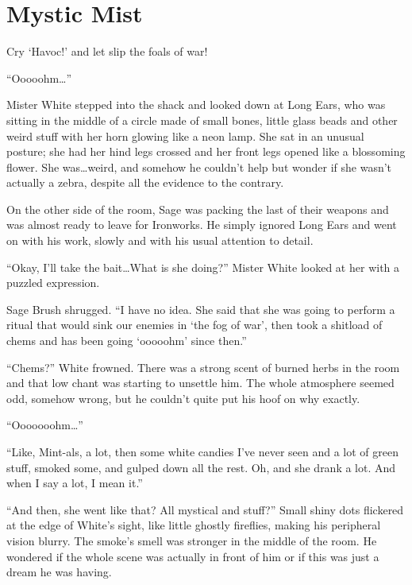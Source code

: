 
\chapter{Mystic Mist}


\begin{intro}
Cry `Havoc!' and let slip the foals of war!
\end{intro}



``Ooooohm\dots''

Mister White stepped into the shack and looked down at Long Ears, who was sitting in the middle of a circle made of small bones, little glass beads and other weird stuff with her horn glowing like a neon lamp. She sat in an unusual posture; she had her hind legs crossed and her front legs opened like a blossoming flower. She was\dots weird, and somehow he couldn't help but wonder if she wasn't actually a zebra, despite all the evidence to the contrary.

On the other side of the room, Sage was packing the last of their weapons and was almost ready to leave for Ironworks. He simply ignored Long Ears and went on with his work, slowly and with his usual attention to detail.

``Okay, I'll take the bait\dots What is she doing?'' Mister White looked at her with a puzzled expression.

Sage Brush shrugged. ``I have no idea. She said that she was going to perform a ritual that would sink our enemies in `the fog of war', then took a shitload of chems and has been going `ooooohm' since then.''

``Chems?'' White frowned. There was a strong scent of burned herbs in the room and that low chant was starting to unsettle him. The whole atmosphere seemed odd, somehow wrong, but he couldn't quite put his hoof on why exactly.

``Ooooooohm\dots''

``Like, Mint-als, a lot, then some white candies I've never seen and a lot of green stuff, smoked some, and gulped down all the rest. Oh, and she drank a lot. And when I say a lot, I mean it.''

``And then, she went like that? All mystical and stuff?'' Small shiny dots flickered at the edge of White's sight, like little ghostly fireflies, making his peripheral vision blurry. The smoke's smell was stronger in the middle of the room. He wondered if the whole scene was actually in front of him or if this was just a dream he was having.

